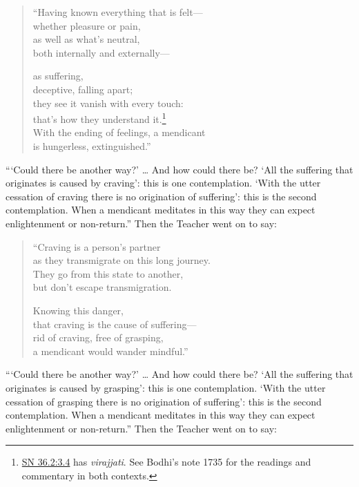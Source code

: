\documentclass[12pt,openany]{book}%
\begin{document}
\begin{verse}%
“Having known everything that is felt—\\
whether pleasure or pain, \\
as well as what’s neutral, \\
both internally and externally—

as suffering, \\
deceptive, falling apart; \\
they see it vanish with every touch: \\
that’s how they understand it.\footnote{\href{https://suttacentral.net/sn36.2/en/sujato\#3.4}{SN 36.2:3.4} has \textit{virajjati}. See Bodhi’s note 1735 for the readings and commentary in both contexts. } \\
With the ending of feelings, a mendicant \\
is hungerless, extinguished.” 

%
\end{verse}

“‘Could there be another way?’ … And how could there be? ‘All the suffering that originates is caused by craving’: this is one contemplation. ‘With the utter cessation of craving there is no origination of suffering’: this is the second contemplation. When a mendicant meditates in this way they can expect enlightenment or non-return.” Then the Teacher went on to say: 

\begin{verse}%
“Craving is a person’s partner \\
as they transmigrate on this long journey. \\
They go from this state to another, \\
but don’t escape transmigration. 

Knowing this danger, \\
that craving is the cause of suffering—\\
rid of craving, free of grasping, \\
a mendicant would wander mindful.” 

%
\end{verse}

“‘Could there be another way?’ … And how could there be? ‘All the suffering that originates is caused by grasping’: this is one contemplation. ‘With the utter cessation of grasping there is no origination of suffering’: this is the second contemplation. When a mendicant meditates in this way they can expect enlightenment or non-return.” Then the Teacher went on to say: 
\end{document}
